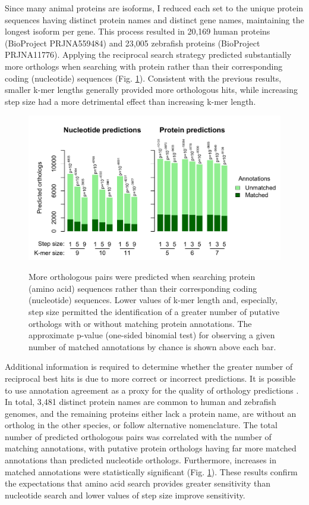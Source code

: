 Since many animal proteins are isoforms, I reduced each set to the unique protein sequences having distinct protein names and distinct gene names, maintaining the longest isoform per gene. This process resulted in 20,169 human proteins (BioProject PRJNA559484) and 23,005 zebrafish proteins (BioProject PRJNA11776). Applying the reciprocal search strategy predicted substantially more orthologs when searching with protein rather than their corresponding coding (nucleotide) sequences (Fig. \ref{fig:fig5}). Consistent with the previous results, smaller k-mer lengths generally provided more orthologous hits, while increasing step size had a more detrimental effect than increasing k-mer length.

\begin{figure}
\includegraphics[width=1\linewidth,alt={}]{figures/Fig5} \caption{More orthologous pairs were predicted when searching protein (amino acid) sequences rather than their corresponding coding (nucleotide) sequences. Lower values of k-mer length and, especially, step size permitted the identification of a greater number of putative orthologs with or without matching protein annotations. The approximate p-value (one-sided binomial test) for observing a given number of matched annotations by chance is shown above each bar.}\label{fig:fig5}
\end{figure}

Additional information is required to determine whether the greater number of reciprocal best hits is due to more correct or incorrect predictions. It is possible to use annotation agreement as a proxy for the quality of orthology predictions \citep{RN257}. In total, 3,481 distinct protein names are common to human and zebrafish genomes, and the remaining proteins either lack a protein name, are without an ortholog in the other species, or follow alternative nomenclature. The total number of predicted orthologous pairs was correlated with the number of matching annotations, with putative protein orthologs having far more matched annotations than predicted nucleotide orthologs. Furthermore, increases in matched annotations were statistically significant (Fig. \ref{fig:fig5}). These results confirm the expectations that amino acid search provides greater sensitivity than nucleotide search and lower values of step size improve sensitivity.


